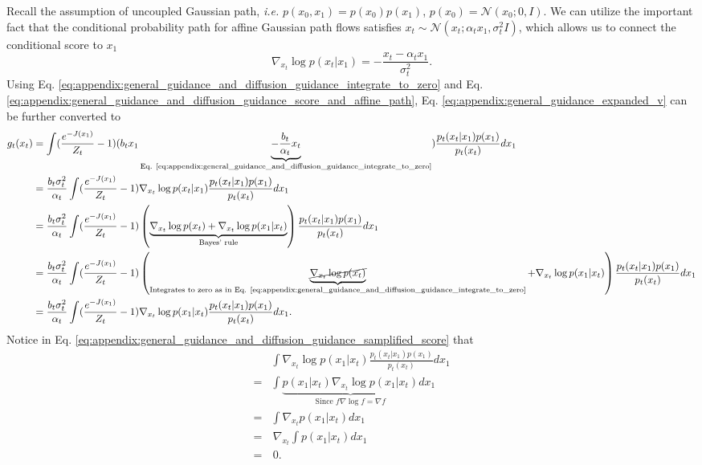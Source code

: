 Recall the assumption of uncoupled Gaussian path, \emph{i.e.} $p(x_0,x_1) = p(x_0) p(x_1)$, $p(x_0) = \mathcal{N}(x_0;0,I)$. We can utilize the important fact that the conditional probability path for affine Gaussian path flows satisfies $x_t \sim \mathcal{N}(x_t;\alpha_t x_1, \sigma_t^2 I)$, which allows us to connect the conditional score to $x_1$
\begin{equation}\label{eq:appendix:general_guidance_and_diffusion_guidance_score_and_affine_path}
    \nabla_{x_t} \log p(x_t|x_1) = -\frac{x_t - \alpha_t x_1}{\sigma_t ^2}.
\end{equation}
Using Eq. \eqref{eq:appendix:general_guidance_and_diffusion_guidance_integrate_to_zero} and Eq. \eqref{eq:appendix:general_guidance_and_diffusion_guidance_score_and_affine_path}, Eq. \eqref{eq:appendix:general_guidance_expanded_v} can be further converted to 
\begin{align}\label{eq:appendix:general_guidance_and_diffusion_guidance_convert_conditional_v_to_score}
    g_t(x_t)& = \int (\frac{e^{-J(x_1)}}{Z_t} - 1) (b_t x_1 \underbrace{- \frac{b_t}{\alpha_t} x_t}_{\text{Eq. \eqref{eq:appendix:general_guidance_and_diffusion_guidance_integrate_to_zero}}}) \frac{p_t(x_t|x_1)p(x_1)}{p_t(x_t)} dx_1 \\ \nonumber
    & = \frac{b_t \sigma_t^2}{\alpha_t} \int (\frac{e^{-J(x_1)}}{Z_t} - 1) \nabla_{x_t} \log p(x_t|x_1) \frac{p_t(x_t|x_1)p(x_1)}{p_t(x_t)} dx_1 \\\nonumber
    & = \frac{b_t \sigma_t^2}{\alpha_t} \int (\frac{e^{-J(x_1)}}{Z_t} - 1) \left(\underbrace{\nabla_{x_t} \log p(x_t) + \nabla_{x_t} \log p(x_1 | x_t)}_{\text{Bayes' rule}}\right) \frac{p_t(x_t|x_1)p(x_1)}{p_t(x_t)} dx_1
    \\
    & = \frac{b_t \sigma_t^2}{\alpha_t} \int (\frac{e^{-J(x_1)}}{Z_t} - 1) \left(\underbrace{\cancel{\nabla_{x_t} \log p(x_t)}}_{\text{Integrates to zero as in Eq. \eqref{eq:appendix:general_guidance_and_diffusion_guidance_integrate_to_zero}}} + \nabla_{x_t} \log p(x_1 | x_t)\right) \frac{p_t(x_t|x_1)p(x_1)}{p_t(x_t)} dx_1 \\
    & = \frac{b_t \sigma_t^2}{\alpha_t} \int (\frac{e^{-J(x_1)}}{Z_t} - 1)  \nabla_{x_t} \log p(x_1 | x_t) \frac{p_t(x_t|x_1)p(x_1)}{p_t(x_t)} dx_1. \label{eq:appendix:general_guidance_and_diffusion_guidance_samplified_score}
\end{align}
Notice in Eq. \eqref{eq:appendix:general_guidance_and_diffusion_guidance_samplified_score} that 
\begin{align}\label{eq:appendix:general_guidance_and_diffusion_guidance_canceling_expectation_of_score}
    \nonumber
    &\int \nabla_{x_t} \log p(x_1 | x_t) \frac{p_t(x_t|x_1)p(x_1)}{p_t(x_t)} dx_1 \\
    \nonumber= & \int \underbrace{p(x_1|x_t)  \nabla_{x_t} \log p(x_1 | x_t)}_{\text{Since } f \nabla  \log f = \nabla f}  dx_1 \\
    \nonumber= & \int \nabla_{x_t} p(x_1 | x_t)  dx_1 \\
    \nonumber= &\, \nabla_{x_t} \int p(x_1 | x_t)  dx_1 \\
    = &\,0.
\end{align}
